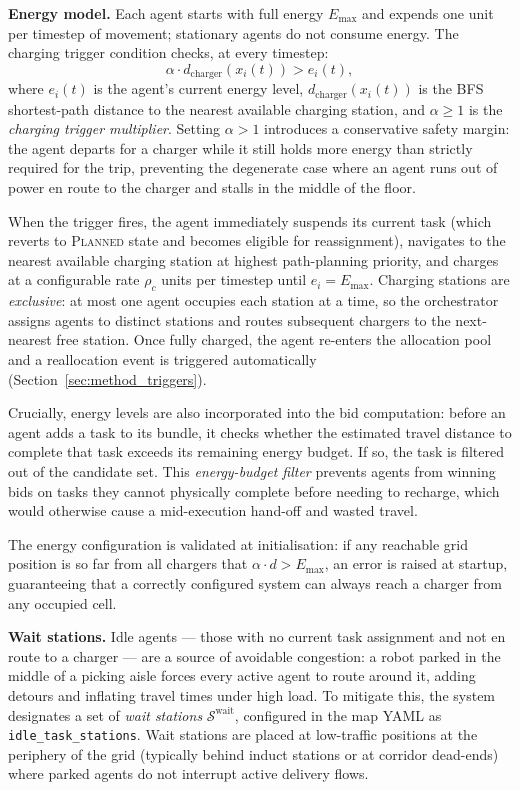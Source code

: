 \textbf{Energy model.}
Each agent starts with full energy $E_{\max}$ and expends one unit per timestep of movement; stationary agents do not consume energy.
The charging trigger condition checks, at every timestep:
\begin{equation}
  \alpha \cdot d_{\text{charger}}(x_i(t)) > e_i(t),
  \label{eq:charge_trigger}
\end{equation}
where $e_i(t)$ is the agent's current energy level,
$d_{\text{charger}}(x_i(t))$ is the BFS shortest-path distance to the
nearest available charging station, and $\alpha \geq 1$ is the
\emph{charging trigger multiplier}.
Setting $\alpha > 1$ introduces a conservative safety margin: the agent
departs for a charger while it still holds more energy than strictly
required for the trip, preventing the degenerate case where an agent runs
out of power en route to the charger and stalls in the middle of the floor.

When the trigger fires, the agent immediately suspends its current task
(which reverts to \textsc{Planned} state and becomes eligible for reassignment),
navigates to the nearest available charging station at highest path-planning
priority, and charges at a configurable rate $\rho_c$ units per timestep
until $e_i = E_{\max}$.
Charging stations are \emph{exclusive}: at most one agent occupies each
station at a time, so the orchestrator assigns agents to distinct stations
and routes subsequent chargers to the next-nearest free station.
Once fully charged, the agent re-enters the allocation pool and a
reallocation event is triggered automatically
(Section~\ref{sec:method_triggers}).

Crucially, energy levels are also incorporated into the bid computation:
before an agent adds a task to its bundle, it checks whether the estimated
travel distance to complete that task exceeds its remaining energy budget.
If so, the task is filtered out of the candidate set.
This \emph{energy-budget filter} prevents agents from winning bids on tasks
they cannot physically complete before needing to recharge, which would
otherwise cause a mid-execution hand-off and wasted travel.

The energy configuration is validated at initialisation: if any reachable
grid position is so far from all chargers that $\alpha \cdot d > E_{\max}$,
an error is raised at startup, guaranteeing that a correctly configured
system can always reach a charger from any occupied cell.

\textbf{Wait stations.}
Idle agents --- those with no current task assignment and not en route to a
charger --- are a source of avoidable congestion: a robot parked in the
middle of a picking aisle forces every active agent to route around it,
adding detours and inflating travel times under high load.
To mitigate this, the system designates a set of \emph{wait stations}
$\mathcal{S}^{\text{wait}}$, configured in the map YAML as
\texttt{idle\_task\_stations}.
Wait stations are placed at low-traffic positions at the periphery of the
grid (typically behind induct stations or at corridor dead-ends) where
parked agents do not interrupt active delivery flows.

